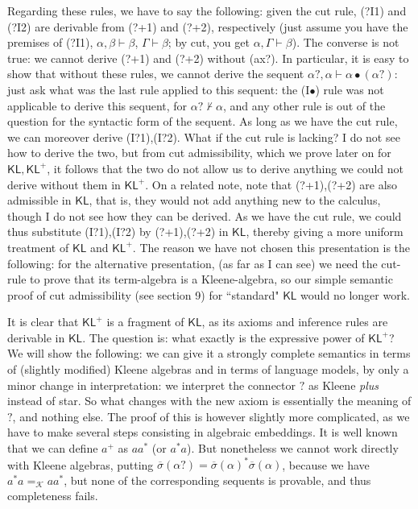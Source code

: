 \documentclass{eptcs}
\newcommand{\KA}{\mathcal{K}}
\newcommand{\osigma}{\overline{\sigma}}
\newcommand{\KL}{\mathsf{KL}}
\begin{document}
Regarding these rules, we have to say the following: given 
the cut rule, (?I1) and (?I2) are derivable from (?+1) and (?+2),
respectively (just assume you have the premises of (?I1), 
$\alpha,\beta\vdash\beta$, $\Gamma\vdash\beta$; by cut, you get
$\alpha,\Gamma\vdash\beta$). The converse is not true: 
we cannot derive (?+1) and (?+2) without (ax?). In particular, it is easy to 
show that without these rules, we cannot derive the sequent
$\alpha?,\alpha\vdash\alpha\bullet(\alpha?)$: just ask what was the
last rule applied to this sequent: the 
(I$\bullet$) rule was not applicable to derive this sequent, 
for $\alpha?\not\vdash\alpha$, and any other rule is out of 
the question for the syntactic form of the sequent.
As long as we have the cut rule, we can moreover
derive (I?1),(I?2). What if the cut rule is lacking? I
do not see how to derive the two, but from 
cut admissibility, which we prove later on
for $\KL,\KL^+$, it follows that the two do not allow
us to derive anything we could not derive without them in
 $\KL^+$. 
On a related note, note that
(?+1),(?+2) are also admissible in $\KL$, that is, they would not
add anything new to the calculus, though I do not see how they 
can be derived. As we have the cut rule, we could thus
substitute (I?1),(I?2) by (?+1),(?+2) in $\KL$, thereby 
giving a more uniform treatment of $\KL$ and $\KL^+$. The 
reason we have not chosen this presentation is the 
following: for the alternative
presentation, (as far as I can see) 
we need the cut-rule to prove that its term-algebra is a Kleene-algebra,
so our simple semantic proof of cut admissibility (see section 9)
for ``standard" $\KL$ would no longer work.





It is clear that $\KL^+$ is a fragment 
of $\KL$, as its axioms and inference rules
are derivable in $\KL$. The question is: what exactly is the expressive
power of $\KL^+$? We will show the following: we can give it
a strongly complete semantics
in terms of (slightly modified) Kleene algebras and in terms of language models,
by only a minor change in interpretation: we interpret 
the connector $?$ as Kleene \textit{plus} instead of star. So
what changes with the new axiom is essentially the meaning of $?$,
and nothing else. The proof of this is however slightly more
complicated, as we have to make several steps consisting in algebraic
embeddings. It is well known that we can 
define $a^+$ as $aa^*$ (or $a^*a$). But nonetheless we cannot
work directly with Kleene algebras, putting 
$\osigma(\alpha?)=\osigma(\alpha)^*\osigma(\alpha)$, because we have
$a^*a=_\KA aa^*$, but none of the corresponding sequents is provable,
and thus completeness fails.
\end{document}

